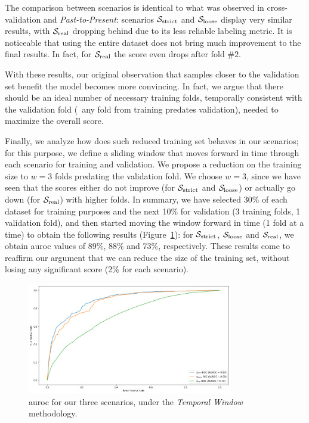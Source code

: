 The comparison between scenarios is identical to what was observed in cross-validation and \textit{Past-to-Present}: scenarios $\mathcal{S}_{\mathrm{strict}}$ and $\mathcal{S}_{\mathrm{loose}}$ display very similar results, with $\mathcal{S}_{\mathrm{real}}$ dropping behind due to its less reliable labeling metric.
It is noticeable that using the entire dataset does not bring much improvement to the final results. In fact, for $\mathcal{S}_{\mathrm{real}}$ the score even drops after fold $\#2$.

With these results, our original observation that samples closer to the validation set benefit the model becomes more convincing. In fact, we argue that there should be an ideal number of necessary training folds, temporally consistent with the validation fold (\ie\ any fold from training predates validation), needed to maximize the overall score.

\medskip

Finally, we analyze how does such reduced training set behaves in our scenarios; for this purpose, we define a sliding window that moves forward in time through each scenario for training and validation.
We propose a reduction on the training size to $w=3$ folds predating the validation fold. We choose $w=3$, since we have seen that the scores either do not improve (for $\mathcal{S}_{\mathrm{strict}}$ and $\mathcal{S}_{\mathrm{loose}}$) or actually go down (for $\mathcal{S}_{\mathrm{real}}$) with higher folds.
In summary, we have selected 30\% of each dataset for training purposes and the next 10\% for validation (3 training folds, 1 validation fold), and then started moving the window forward in time (1 fold at a time) to obtain the following results (Figure~\ref{fig:slidingwindow}): for  $\mathcal{S}_{\mathrm{strict}}$, $\mathcal{S}_{\mathrm{loose}}$ and $\mathcal{S}_{\mathrm{real}}$, we obtain \gls{auroc} values of 89\%, 88\% and 73\%, respectively. 
These results come to reaffirm our argument that we can reduce the size of the training set, without losing any significant score (2\% for each scenario).

\begin{figure}[!h]
	\centering
	\includegraphics[width=0.8\textwidth]{Figures/slidingwindow.png}
	\caption[Single layer results for static features in \textit{Temporal Window}.]{\gls{auroc} for our three scenarios, under the \textit{Temporal Window} methodology.}
	\label{fig:slidingwindow}
\end{figure}

